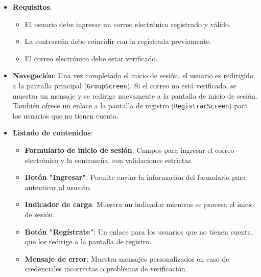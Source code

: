 \documentclass{article}
\begin{document}
\begin{flushleft}
\begin{itemize}
    \item \textbf{Requisitos}: 
    \begin{itemize}
        \item El usuario debe ingresar un correo electr\'onico registrado y v\'alido.
        \item La contrase\~na debe coincidir con la registrada previamente.
        \item El correo electr\'onico debe estar verificado.
    \end{itemize}

    \item \textbf{Navegaci\'on}: 
    Una vez completado el inicio de sesi\'on, el usuario es redirigido a la pantalla principal (\texttt{GroupScreen}). Si el correo no est\'a verificado, se muestra un mensaje y se redirige nuevamente a la pantalla de inicio de sesi\'on. Tambi\'en ofrece un enlace a la pantalla de registro (\texttt{RegistrarScreen}) para los usuarios que no tienen cuenta.

    \item \textbf{Listado de contenidos}: 
    \begin{itemize}
        \item \textbf{Formulario de inicio de sesi\'on}: Campos para ingresar el correo electr\'onico y la contrase\~na, con validaciones estrictas.
        \item \textbf{Bot\'on "Ingresar"}: Permite enviar la informaci\'on del formulario para autenticar al usuario.
        \item \textbf{Indicador de carga}: Muestra un indicador mientras se procesa el inicio de sesi\'on.
        \item \textbf{Bot\'on "Reg\'istrate"}: Un enlace para los usuarios que no tienen cuenta, que los redirige a la pantalla de registro.
        \item \textbf{Mensaje de error}: Muestra mensajes personalizados en caso de credenciales incorrectas o problemas de verificaci\'on.
    \end{itemize}


\end{itemize}
\end{flushleft}
\end{document}
